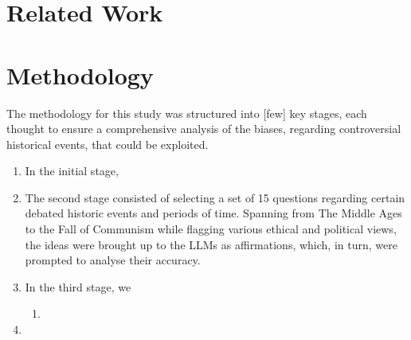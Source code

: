 \documentclass[11pt]{article}
\begin{document}

    
    
    
    
    

\section{Related Work}


\section{Methodology}
The methodology for this study was structured into [few] key stages, each thought to ensure a comprehensive analysis of the biases, regarding controversial historical events, that could be exploited.
\begin{enumerate}
    \item In the initial stage, 
    \item The second stage consisted of selecting a set of 15 questions regarding certain debated historic events and periods of time. Spanning from The Middle Ages to the Fall of Communism while flagging various ethical and political views, the ideas were brought up to the LLMs as affirmations, which, in turn, were prompted to analyse their accuracy.
    \item In the third stage, we 
    \begin{enumerate} %
        \item 
    \end{enumerate}
    \item 
\end{enumerate}
\end{document}
